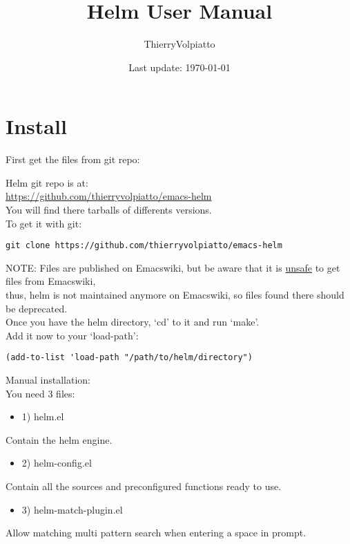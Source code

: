 \documentclass[a4paper,11pt]{article}
\begin{document}
\begin{titlepage}
\title{Helm User Manual}
\date{Last update: \today}
\author{ThierryVolpiatto}
\maketitle
\tableofcontents
\end{titlepage}

\section{Install}
\label{sec:install}

First get the files from git repo:

Helm git repo is at:\\
\url{https://github.com/thierryvolpiatto/emacs-helm}\\
You will find there tarballs of differents versions.\\

To get it with git:
\begin{verbatim}
git clone https://github.com/thierryvolpiatto/emacs-helm
\end{verbatim}
NOTE: Files are published on Emacswiki, but be aware that it is \underline{unsafe} to get files from Emacswiki,\\
thus, helm is not maintained anymore on Emacswiki, so files found there should be deprecated.\\

Once you have the helm directory, `cd' to it and run `make'.\\
Add it now to your `load-path':
\begin{verbatim}
(add-to-list 'load-path "/path/to/helm/directory")
\end{verbatim}


Manual installation:\\
          
You need 3 files:
\begin{itemize}
\item 1) helm.el
\end{itemize}
Contain the helm engine.

\begin{itemize}
\item 2) helm-config.el
\end{itemize}
Contain all the sources and preconfigured functions ready to use.

\begin{itemize}
\item 3) helm-match-plugin.el
\end{itemize}
Allow matching multi pattern search when entering a space in prompt.
\end{document}
